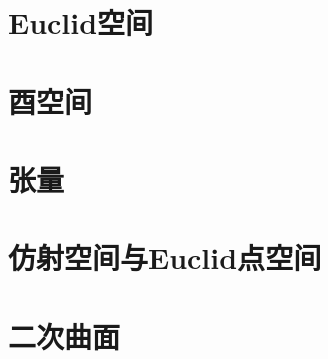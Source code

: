 \documentclass[openany]{book}
\begin{document}
\chapter{Euclid空间} %

\chapter{酉空间}

\chapter{张量}

\chapter{仿射空间与Euclid点空间} %

\chapter{二次曲面}
\end{document}
